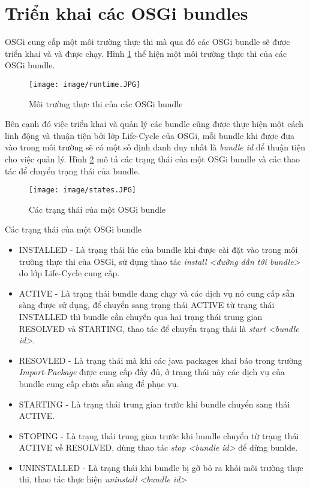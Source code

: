 \section{Triển khai các OSGi bundles}
OSGi cung cấp một môi trường thực thi mà qua đó các OSGi bundle sẽ được triển khai và và được chạy. Hình \ref{fig:runtime} thể hiện một môi trường thực thi của các OSGi bundle.
\begin{figure}[htbp]
	\centering
		\texttt{[image: image/runtime.JPG]}
	\caption{Môi trường thực thi của các OSGi bundle}
	\label{fig:runtime}
\end{figure}
Bên cạnh đó việc triển khai và quản lý các bundle cũng được thực hiện một cách linh động và thuận tiện bởi lớp Life-Cycle của OSGi, mỗi bundle khi được đưa vào trong môi trường sẽ có một số định danh duy nhất là \textit{bundle id} để thuận tiện cho việc quản lý. Hình \ref{fig:states} mô tả các trạng thái của một OSGi bundle và các thao tác để chuyển trạng thái của bundle.
\begin{figure}[hbtp]
	\centering
		\texttt{[image: image/states.JPG]}
	\caption{Các trạng thái của một OSGi bundle}
	\label{fig:states}
\end{figure}

Các trạng thái của một OSGi bundle 

\begin{itemize}
\item INSTALLED - Là trạng thái lúc của bundle khi được cài đặt vào trong môi trường thực thi của OSGi, sử dụng thao tác \textit{install <đường dẫn tới bundle>} do lớp Life-Cycle cung cấp.
\item ACTIVE - Là trạng thái bundle đang chạy và các dịch vụ nó cung cấp sẵn sàng được sử dụng, để chuyển sang trạng thái ACTIVE từ trạng thái INSTALLED thì bundle cần chuyển qua hai trạng thái trung gian RESOLVED và STARTING, thao tác để chuyển trạng thái là \textit{start <bundle id>}.
\item RESOVLED - Là trạng thái mà khi các java packages khai báo trong  trường \textit{Import-Package} được cung cấp đầy đủ, ở trạng thái này các dịch vụ của bundle cung cấp chưa sẵn sàng để phục vụ.
\item STARTING - Là trạng thái trung gian trước khi bundle chuyển sang thái ACTIVE.
\item STOPING - Là trạng thái trung gian trước khi bundle chuyển từ trạng thái ACTIVE về RESOLVED, dùng thao tác \textit{stop <bundle id>} để dừng bunlde.
\item UNINSTALLED - Là trạng thái khi bundle bị gỡ bỏ ra khỏi môi trường thực thi, thao tác thực hiện \textit{uninstall <bundle id>}
\end{itemize}

